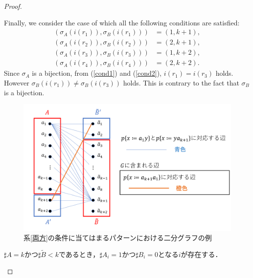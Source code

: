 \begin{proof}
\begin{enumerate}
\begin{enumerate}
Finally, we consider the case of which all the following conditions are satisfied:
\begin{align}
(\sigma_{A}(i(r_{1})), \sigma_{B}(i(r_{1}))) &= (1, k + 1),\label{cond1}\\
(\sigma_{A}(i(r_{2})), \sigma_{B}(i(r_{2}))) &= (2, k + 1),\\
(\sigma_{A}(i(r_{3})), \sigma_{B}(i(r_{3}))) &= (1, k + 2),\label{cond2}\\
(\sigma_{A}(i(r_{4})), \sigma_{B}(i(r_{4}))) &= (2, k + 2).
\end{align}
Since $\sigma_{A}$ is a bijection, from (\ref{cond1}) and (\ref{cond2}), $i(r_{1}) = i(r_{3})$ holds.
However $\sigma_{B}(i(r_{1})) \not= \sigma_{B}(i(r_{3}))$ holds.
This is contrary to the fact that $\sigma_{B}$ is a bijection.

\begin{figure}[t]
\centering
\includegraphics[width=\linewidth]{figs/Exam-BipartiteGraph-Corollary.png}
\caption{系\ref{両方}の条件に当てはまるパターンにおける二分グラフの例}
\label{系との関係}
\end{figure}

\smallskip

$\sharp A = k$かつ$\sharp \tilde{B} < k$であるとき，$\sharp A_{i}=1$かつ$\sharp B_{i}=0$となる$i$が存在する．


\end{enumerate}
\end{enumerate}
\end{proof}
